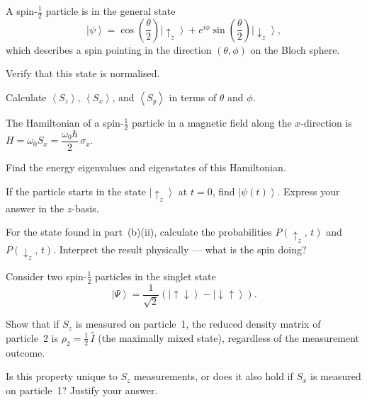 \documentclass[12pt,a4paper]{article}
\renewcommand{\ket}[1]{\left|#1\right\rangle}
\renewcommand{\expect}[1]{\left\langle #1\right\rangle}
\begin{document}
\begin{parts}
\item A spin-$\frac{1}{2}$ particle is in the general state
\[
\ket{\psi} = \cos\!\left(\frac{\theta}{2}\right)\ket{\!\uparrow_z} + e^{i\phi}\sin\!\left(\frac{\theta}{2}\right)\ket{\!\downarrow_z},
\]
which describes a spin pointing in the direction $(\theta,\phi)$ on the Bloch sphere.
\begin{parts}
\item Verify that this state is normalised. 
\item Calculate $\expect{S_z}$, $\expect{S_x}$, and $\expect{S_y}$ in terms of $\theta$ and $\phi$. 
\end{parts}

\item The Hamiltonian of a spin-$\frac{1}{2}$ particle in a magnetic field along the $x$-direction is $H = \omega_0 S_x = \dfrac{\omega_0\hbar}{2}\,\sigma_x$.
\begin{parts}
\item Find the energy eigenvalues and eigenstates of this Hamiltonian. 
\item If the particle starts in the state $\ket{\!\uparrow_z}$ at $t = 0$, find $\ket{\psi(t)}$. Express your answer in the $z$-basis. 
\end{parts}

\item For the state found in part~(b)(ii), calculate the probabilities $P(\uparrow_z,\,t)$ and $P(\downarrow_z,\,t)$. Interpret the result physically --- what is the spin doing? 

\item Consider two spin-$\frac{1}{2}$ particles in the singlet state
\[
\ket{\Psi} = \frac{1}{\sqrt{2}}\left(\ket{\!\uparrow\downarrow} - \ket{\!\downarrow\uparrow}\right).
\]
\begin{parts}
\item Show that if $S_z$ is measured on particle~1, the reduced density matrix of particle~2 is $\rho_2 = \tfrac{1}{2}\,\hat{I}$ (the maximally mixed state), regardless of the measurement outcome. 
\item Is this property unique to $S_z$ measurements, or does it also hold if $S_x$ is measured on particle~1? Justify your answer. 
\end{parts}
\end{parts}

\newpage


\end{document}
